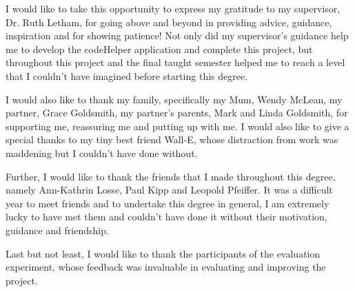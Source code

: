 \begin{acknowledgement}

I would like to take this opportunity to express my gratitude to my supervisor, Dr. Ruth Letham, for going above and beyond in providing advice, guidance, inspiration and for showing patience! Not only did my supervisor's guidance help me to develop the codeHelper application and complete this project, but throughout this project and the final taught semester helped me to reach a level that I couldn't have imagined before starting this degree. 

I would also like to thank my family, specifically my Mum, Wendy McLean, my partner, Grace Goldsmith, my partner's parents, Mark and Linda Goldsmith, for supporting me, reassuring me and putting up with me. I would also like to give a special thanks to my tiny best friend Wall-E, whose distraction from work was maddening but I couldn't have done without. 

Further, I would like to thank the friends that I made throughout this degree, namely Ann-Kathrin Losse, Paul Kipp and Leopold Pfeiffer. It was a difficult year to meet friends and to undertake this degree in general, I am extremely lucky to have met them and couldn't have done it without their motivation, guidance and friendship.

Last but not least, I would like to thank the participants of the evaluation experiment, whose feedback was invaluable in evaluating and improving the project.

\end{acknowledgement}